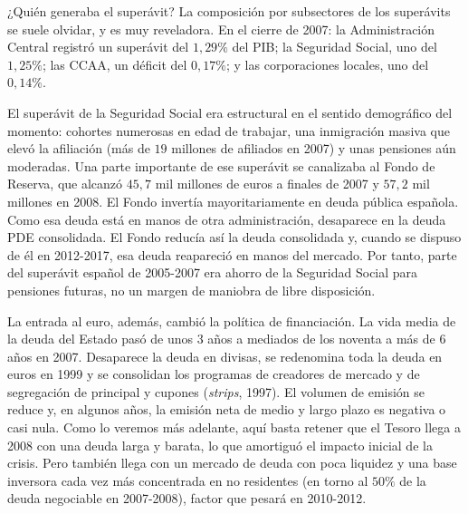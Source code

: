 \documentclass[10pt,a4paper]{article}
\begin{document}
¿Quién generaba el superávit? La composición por subsectores de los superávits se suele olvidar, y es muy reveladora. En el cierre de 2007: la Administración Central registró un superávit del $1,29\%$ del PIB; la Seguridad Social, uno del $1,25\%$; las CCAA, un déficit del $0,17\%$; y las corporaciones locales, uno del $0,14\%$.

El superávit de la Seguridad Social era estructural en el sentido demográfico del momento: cohortes numerosas en edad de trabajar, una inmigración masiva que elevó la afiliación (más de $19$ millones de afiliados en 2007) y unas pensiones aún moderadas. Una parte importante de ese superávit se canalizaba al Fondo de Reserva, que alcanzó $45,7$ mil millones de euros a finales de 2007 y $57,2$ mil millones en 2008. El Fondo invertía mayoritariamente en deuda pública española. Como esa deuda está en manos de otra administración, desaparece en la deuda PDE consolidada. El Fondo reducía así la deuda consolidada y, cuando se dispuso de él en 2012-2017, esa deuda reapareció en manos del mercado. Por tanto, parte del superávit español de 2005-2007 era ahorro de la Seguridad Social para pensiones futuras, no un margen de maniobra de libre disposición. 

La entrada al euro, además, cambió la política de financiación. La vida media de la deuda del Estado pasó de unos $3$ años a mediados de los noventa a más de $6$ años en 2007. Desaparece la deuda en divisas, se redenomina toda la deuda en euros en 1999 y se consolidan los programas de creadores de mercado y de segregación de principal y cupones (\textit{strips}, 1997). El volumen de emisión se reduce y, en algunos años, la emisión neta de medio y largo plazo es negativa o casi nula. Como lo veremos más adelante, aquí basta retener que el Tesoro llega a 2008 con una deuda larga y barata, lo que amortiguó el impacto inicial de la crisis. Pero también llega con un mercado de deuda con poca liquidez y una base inversora cada vez más concentrada en no residentes (en torno al $50\%$ de la deuda negociable en 2007-2008), factor que pesará en 2010-2012.
\end{document}
